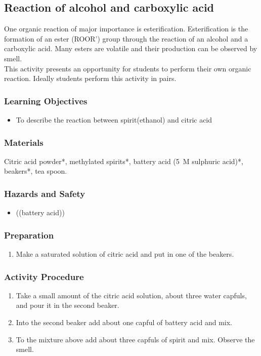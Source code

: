 \subsection{Reaction of alcohol and carboxylic acid}

One organic reaction of major importance is esterification. Esterification is the formation of an ester (ROOR') group through the reaction of an alcohol and a carboxylic acid. Many esters are volatile and their production can be observed by smell.\\
This activity presents an opportunity for students to perform their own organic reaction. Ideally students perform this activity in pairs.

\subsubsection*{Learning Objectives}
\begin{itemize}
\item{To describe the reaction between spirit(ethanol) and citric acid}
\end{itemize}

\subsubsection*{Materials}
Citric acid powder*, methylated spirits*, battery acid (5~M sulphuric acid)*, beakers*, tea spoon.

\subsubsection*{Hazards and Safety}
\begin{itemize}
\item{((battery acid))}
\end{itemize}

\subsubsection*{Preparation}
\begin{enumerate}
\item{Make a saturated solution of citric acid and put in one of the beakers.}
\end{enumerate}

\subsubsection*{Activity Procedure}
\begin{enumerate}
\item{Take a small amount of the citric acid solution, about three water capfuls, and pour it in the second beaker.}
\item{Into the second beaker add about one capful of battery acid and mix.}
\item{To the mixture above add about three capfuls of spirit and mix. Observe the smell.}
\end{enumerate}

